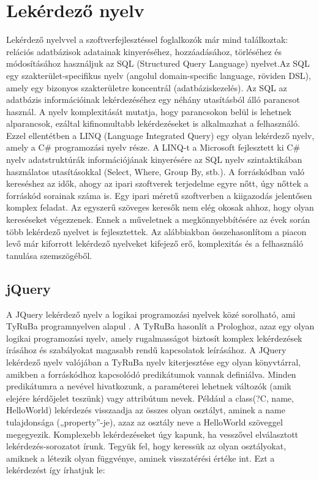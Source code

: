 \documentclass[a4paper,12pt]{report}
\begin{document}
\chapter{Lekérdező nyelv}
Lekérdező nyelvvel a szoftverfejlesztéssel foglalkozók már mind találkoztak: relációs adatbázisok adatainak kinyeréséhez, hozzáadásához, törléséhez és módosításához használjuk az SQL (Structured Query Language) nyelvet.Az SQL egy szakterület-specifikus nyelv (angolul domain-specific language, röviden DSL), amely egy bizonyos szakterületre koncentrál (adatbáziskezelés). Az SQL az adatbázis információinak lekérdezéséhez egy néhány utasításból álló parancsot használ. A nyelv komplexitását mutatja, hogy parancsokon belül is lehetnek alparancsok, ezáltal kifinomultabb lekérdezéseket is alkalmazhat a felhasználó. Ezzel ellentétben a LINQ (Language Integrated Query) egy olyan lekérdező nyelv, amely a C\# programozási nyelv része. A LINQ-t a Microsoft fejlesztett ki C\# nyelv adatstruktúrák információjának kinyerésére az SQL nyelv szintaktikában használatos utasításokkal (Select, Where, Group By, stb.). A forráskódban való kereséshez az idők, ahogy az ipari szoftverek terjedelme egyre nőtt, úgy nőttek a forráskód sorainak száma is. Egy ipari méretű szoftverben a kiigazodás jelentősen komplex feladat. Az egyszerű szöveges keresők nem elég okosak ahhoz, hogy olyan kereséseket végezzenek. Ennek a műveletnek a megkönnyebbítésére az évek során több lekérdező nyelvet is fejlesztettek. Az alábbiakban összehasonlítom a piacon levő már kiforrott lekérdező nyelveket kifejező erő, komplexitás és a felhasználó tanulása szemszögéből.

\section{jQuery}
A JQuery lekérdező nyelv a logikai programozási nyelvek közé sorolható, ami TyRuBa programnyelven alapul \cite{jquery}. A TyRuBa hasonlít a Prologhoz, azaz egy olyan logikai programozási nyelv, amely rugalmasságot biztosít komplex lekérdezések írásához és szabályokat magasabb rendű kapcsolatok leírásához. A JQuery lekérdező nyelv valójában a TyRuBa nyelv kiterjesztése egy olyan könyvtárral, amikben a forráskódhoz kapcsolódó predikátumok vannak definiálva. Minden predikátumra a nevével hivatkozunk, a paraméterei lehetnek változók (amik elejére kérdőjelet teszünk) vagy attribútum nevek. Például a class(?C, name, HelloWorld) lekérdezés visszaadja az összes olyan osztályt, aminek a name tulajdonsága („property”-je), azaz az osztály neve a HelloWorld szöveggel megegyezik. Komplexebb lekérdezéseket úgy kapunk, ha vesszővel elválasztott lekérdezés-sorozatot írunk. Tegyük fel, hogy keressük az olyan osztályokat, amiknek a létezik olyan függvénye, aminek visszatérési értéke int. Ezt a lekérdezést így írhatjuk le:
\end{document}

